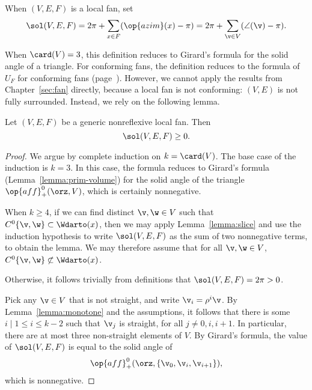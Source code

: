 \begin{definition}  When $(V,E,F)$ is a local fan, set
\[
\sol(V,E,F) =  2\pi + \sum_{x\in F}(\op{azim}(x)-\pi) = 2\pi + \sum_{\v\in V} (\angle(\v) -\pi).
\]
\end{definition}
%

When $\card(V)=3$, this definition reduces to Girard's formula for the
solid angle of a triangle.  For conforming fans, the definition
reduces to the  formula of $U_F$ for conforming fans
(page~\pageref{def:conforming}).  However, we cannot apply the results
from Chapter~\ref{sec:fan} directly, because a local fan is not
conforming: $(V,E)$ is not fully surrounded. Instead, we rely on the
following lemma.


\begin{lemma}\label{lemma:sol-local}
Let $(V,E,F)$ be a generic nonreflexive local fan.  Then
\[
\sol(V,E,F) \ge 0.  %
\]
\end{lemma}

\begin{proof} 
  We argue by complete induction on $k=\card(V)$.  The base case of
  the induction is $k=3$.  In this case, the formula reduces to
  Girard's formula (Lemma~\ref{lemma:prim-volume}) for the solid angle
  of the triangle $\op{aff}_+^0(\orz,V)$, which is certainly
  nonnegative.

  When $k\ge4$, if we can find distinct $\v,\w\in V$ such that
  $C^0\{\v,\w\}\subset \Wdarto(x)$, then we may apply
  Lemma~\ref{lemma:slice} and use the induction hypothesis to write
  $\sol(V,E,F)$ as the sum of two nonnegative terms, to obtain the
  lemma.  We may therefore assume that for all $\v,\w\in V$,
  $C^0\{\v,\w\}\not\subset \Wdarto(x)$.

  Otherwise,
it follows trivially from definitions that $\sol(V,E,F)=2\pi>0$.

Pick any $\v\in V$ that is not straight, and write $\v_i = \rho^i\v$.  By
Lemma~\ref{lemma:monotone} and the assumptions, it follows that there
is some $i\mid 1 \le i \le k-2$ such that $\v_j$ is straight, for all
$j\ne 0,i,i+1$.  In particular, there are at most three non-straight
elements of $V$.  By Girard's formula, the value of $\sol(V,E,F)$ is
equal to the solid angle of
\[
\op{aff}_+^0(\orz,\{\v_0,\v_i,\v_{i+1}\}),
\]
which is nonnegative.
\end{proof}



